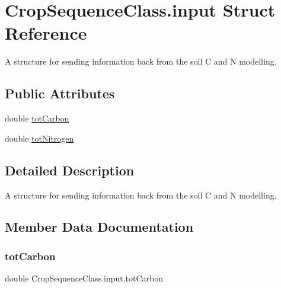 \hypertarget{struct_crop_sequence_class_1_1input}{}\section{Crop\+Sequence\+Class.\+input Struct Reference}
\label{struct_crop_sequence_class_1_1input}


A structure for sending information back from the soil C and N modelling.  


\subsection*{Public Attributes}
\begin{DoxyCompactItemize}
\item 
double \mbox{\hyperlink{struct_crop_sequence_class_1_1input_a9206773ea0414c13381f0d11d1e5badf}{tot\+Carbon}}
\item 
double \mbox{\hyperlink{struct_crop_sequence_class_1_1input_ac0e76b502a9dc545d77580fe2de3b842}{tot\+Nitrogen}}
\end{DoxyCompactItemize}


\subsection{Detailed Description}
A structure for sending information back from the soil C and N modelling. 

\subsection{Member Data Documentation}
\mbox{\label{struct_crop_sequence_class_1_1input_a9206773ea0414c13381f0d11d1e5badf}} 
\subsubsection{\texorpdfstring{totCarbon}{totCarbon}}
{\footnotesize\ttfamily double Crop\+Sequence\+Class.\+input.\+tot\+Carbon}

\mbox{\label{struct_crop_sequence_class_1_1input_ac0e76b502a9dc545d77580fe2de3b842}} 
